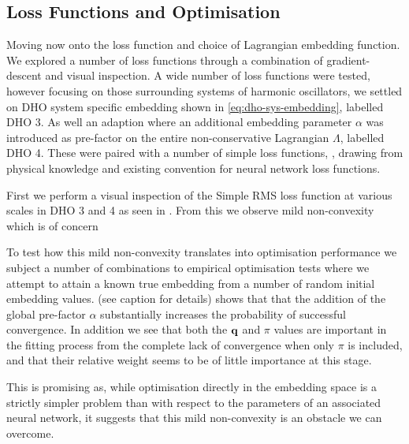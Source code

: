 \subsection{Loss Functions and Optimisation}
\label{sec:res-lf}

Moving now onto the loss function and choice of Lagrangian embedding function. We explored a number of loss functions through a combination of gradient-descent and visual inspection.
A wide number of loss functions were tested, however focusing on those surrounding systems of harmonic oscillators, we settled on DHO system specific embedding shown in \eqref{eq:dho-sys-embedding}, labelled DHO 3.
As well an adaption where an additional embedding parameter $\alpha$ was introduced as pre-factor on the entire non-conservative Lagrangian $\Lambda$, labelled DHO 4. 
These were paired with a number of simple loss functions, , drawing from physical knowledge and existing convention for neural network loss functions.

First we perform a visual inspection of the Simple RMS loss function at various scales in DHO 3 and 4 as seen in . From this we observe mild non-convexity which is of concern

To test how this mild non-convexity translates into optimisation performance we subject a number of combinations to empirical optimisation tests where we attempt to attain a known true embedding from a number of random initial embedding values.  (see caption for details) shows that that the addition of the global pre-factor $\alpha$ substantially increases the probability of successful convergence.  In addition we see that both the $\vb{q}$ and $\pi$ values are important in the fitting process from the complete lack of convergence when only $\pi$ is included, and that their relative weight seems to be of little importance at this stage.

This is promising as, while optimisation directly in the embedding space is a strictly simpler problem than with respect to the parameters of an associated neural network, it suggests that this mild non-convexity is an obstacle we can overcome.

